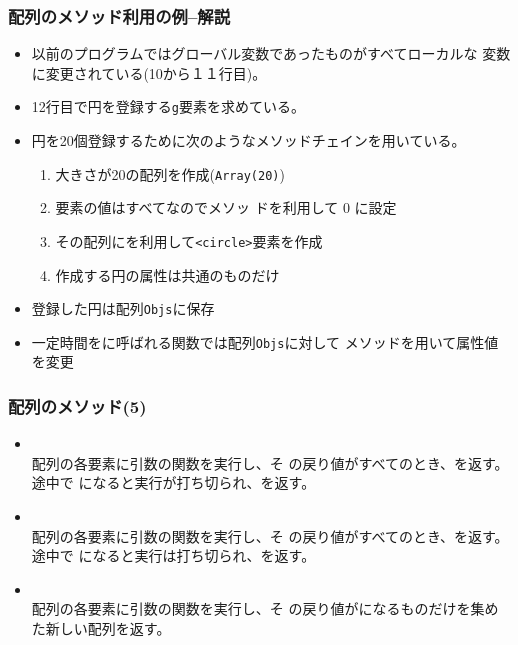 \begin{frame}[containsverbatim]
 \frametitle{配列のメソッド利用の例--解説}
\begin{itemize}
 \item 以前のプログラムではグローバル変数であったものがすべてローカルな
			 変数に変更されている(10から１１行目)。
 \item 12行目で円を登録する\texttt{g}要素を求めている。
 \item 円を20個登録するために次のようなメソッドチェインを用いている。
			 \begin{enumerate}
				\item 大きさが20の配列を作成(\texttt{Array(20)})
				\item 要素の値はすべてなのでメソッ
							ドを利用して 0 に設定
				\item その配列にを利用して\texttt{<circle>}要素を作成
				\item 作成する円の属性は共通のものだけ
			 \end{enumerate}
 \item 登録した円は配列\texttt{Objs}に保存
 \item 一定時間をに呼ばれる関数では配列\texttt{Objs}に対して
			 メソッドを用いて属性値を変更
\end{itemize}
\end{frame}
\begin{frame}[containsverbatim]
 \frametitle{配列のメソッド(5)}
\begin{itemize}
 \item {}\\配列の各要素に引数の関数を実行し、そ
       の戻り値がすべてのとき、を返す。途中で
       になると実行が打ち切られ、を返す。
 \item {}\\配列の各要素に引数の関数を実行し、そ
       の戻り値がすべてのとき、を返す。途中で
       になると実行は打ち切られ、を返す。
 \item {}\\配列の各要素に引数の関数を実行し、そ
       の戻り値がになるものだけを集めた新しい配列を返す。
\end{itemize} 
\end{frame}
